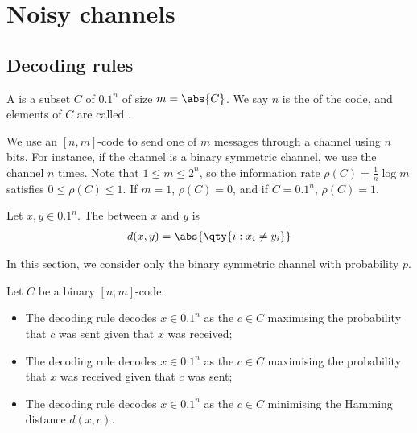 \section{Noisy channels}

\subsection{Decoding rules}
\begin{definition}
    A  is a subset $C$ of $\qty{0,1}^n$ of size $m = \abs{C}$.
    We say $n$ is the  of the code, and elements of $C$ are called .
\end{definition}

We use an $[n,m]$-code to send one of $m$ messages through a channel using $n$ bits.
For instance, if the channel is a binary symmetric channel, we use the channel $n$ times.
Note that $1 \leq m \leq 2^n$, so the information rate $\rho(C) = \frac{1}{n} \log m$ satisfies $0 \leq \rho(C) \leq 1$.
If $m = 1$, $\rho(C) = 0$, and if $C = \qty{0,1}^n$, $\rho(C) = 1$.

\begin{definition}
    Let $x, y \in \qty{0,1}^n$.
    The  between $x$ and $y$ is
    \begin{align*}
        d(x,y) = \abs{\qty{i : x_i \neq y_i}}
    \end{align*}
\end{definition}

In this section, we consider only the binary symmetric channel with probability $p$.

\begin{definition}
    Let $C$ be a binary $[n,m]$-code.
    \begin{itemize}
        \item The  decoding rule decodes $x \in \qty{0,1}^n$ as the $c \in C$ maximising the probability that $c$ was sent given that $x$ was received;
        \item The  decoding rule decodes $x \in \qty{0,1}^n$ as the $c \in C$ maximising the probability that $x$ was received given that $c$ was sent;
        \item The  decoding rule decodes $x \in \qty{0,1}^n$ as the $c \in C$ minimising the Hamming distance $d(x,c)$.
    \end{itemize}
\end{definition}

